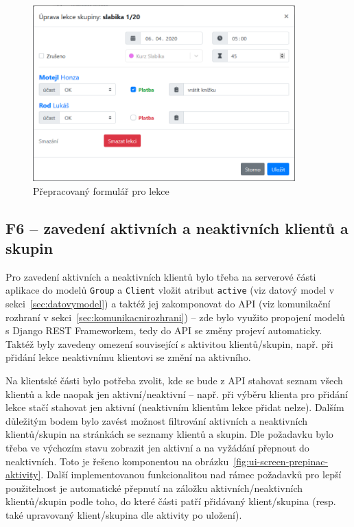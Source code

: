 \begin{figure}[h]\centering
    \includegraphics[width=0.9\textwidth]{img/ui-screen-formular-lekce.png}
    \caption{Přepracovaný formulář pro lekce}\label{fig:ui-screen-formular-lekce}
\end{figure}

\subsection{F6 -- zavedení aktivních a neaktivních klientů a skupin}

Pro zavedení aktivních a neaktivních klientů bylo třeba na serverové části aplikace do modelů \verb|Group| a \verb|Client| vložit atribut \verb|active| (viz datový model v sekci~\ref{sec:datovymodel}) a taktéž jej zakomponovat do API (viz komunikační rozhraní v sekci~\ref{sec:komunikacnirozhrani}) -- zde bylo využito propojení modelů s Django REST Frameworkem, tedy do API se změny projeví automaticky. Taktéž byly zavedeny omezení související s aktivitou klientů/skupin, např. při přidání lekce neaktivnímu klientovi se změní na aktivního.

Na klientské části bylo potřeba zvolit, kde se bude z API stahovat seznam všech klientů a kde naopak jen aktivní/neaktivní -- např. při výběru klienta pro přidání lekce stačí stahovat jen aktivní (neaktivním klientům lekce přidat nelze). Dalším důležitým bodem bylo zavést možnost filtrování aktivních a neaktivních klientů/skupin na stránkách se seznamy klientů a skupin. Dle požadavku bylo třeba ve výchozím stavu zobrazit jen aktivní a na vyžádání přepnout do neaktivních. Toto je řešeno komponentou na obrázku~\ref{fig:ui-screen-prepinac-aktivity}. Další implementovanou funkcionalitou nad rámec požadavků pro lepší použitelnost je automatické přepnutí na záložku aktivních/neaktivních klientů/skupin podle toho, do které části patří přidávaný klient/skupina (resp. také upravovaný klient/skupina dle aktivity po uložení).

